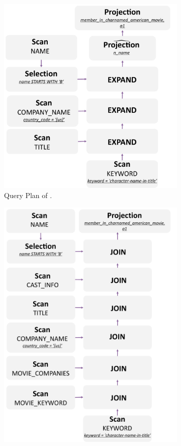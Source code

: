 \begin{figure}[ht]
    \centering
    \begin{subfigure}[b]{.3\linewidth}
        \centering
        \includegraphics[width=.9\linewidth]{./figures/job17a-plan-gopt.pdf}
        \caption{Query Plan of \name.}
        \label{fig:job17a-plan-relgo}
    \end{subfigure}
    \begin{subfigure}[b]{.25\linewidth}
        \centering
        \includegraphics[width=.95\linewidth]{./figures/job17a-plan-graindb.pdf}

\end{subfigure}
\end{figure}
